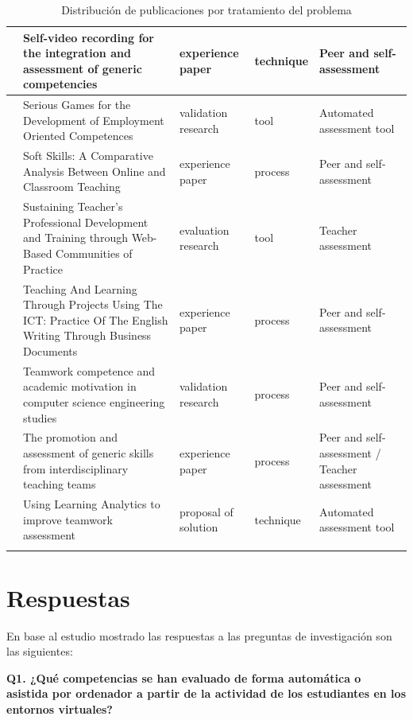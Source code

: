 \begin{landscape}
\begin{center}
\begin{longtable}{| c | m{9cm} | m{4cm} | m{2.5cm} | m{3.5cm} |}
    \hline
    \cite{masip2013self} & Self-video recording for the integration and assessment of generic competencies & experience paper & technique & Peer and self-assessment \\
    \hline
    \cite{guenaga2013serious} & Serious Games for the Development of Employment Oriented Competences & validation research & tool & Automated assessment tool \\
    \hline
    \cite{ruizacarate2013soft} & Soft Skills: A Comparative Analysis Between Online and Classroom Teaching & experience paper & process & Peer and self-assessment \\
    \hline
    \cite{starcic2008sustaining} & Sustaining Teacher's Professional Development and Training through Web-Based Communities of Practice & evaluation research & tool & Teacher assessment \\
    \hline
    \cite{renau2010teaching} & Teaching And Learning Through Projects Using The ICT: Practice Of The English Writing Through Business Documents & experience paper & process & Peer and self-assessment \\
    \hline
    \cite{martinez2014teamwork} & Teamwork competence and academic motivation in computer science engineering studies & validation research & process & Peer and self-assessment \\
    \hline
    \cite{carreras2013promotion} & The promotion and assessment of generic skills from interdisciplinary teaching teams & experience paper & process & Peer and self-assessment / Teacher assessment \\
    \hline
    \cite{fidalgo:2015} & Using Learning Analytics to improve teamwork assessment & proposal of solution & technique & Automated assessment tool \\
    \hline
\caption{Distribución de publicaciones por tratamiento del problema}
\label{tab:ListadoTrabajos}
\end{longtable}
\end{center}
\end{landscape}

\pagestyle{fancy}
\section{Respuestas}

En base al estudio mostrado las respuestas a las preguntas de investigación son las siguientes:

\bigskip
\textbf{Q1. ¿Qué competencias se han evaluado de forma automática o asistida por ordenador a partir de la actividad de los estudiantes en los entornos virtuales?}

